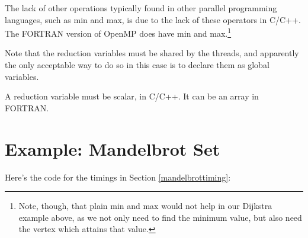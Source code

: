The lack of other operations typically found in other parallel
programming languages, such as min and max, is due to the lack of these
operators in C/C++.  The FORTRAN version of OpenMP does have min and
max.\footnote{Note, though, that plain min and max would not help in our
Dijkstra example above, as we not only need to find the minimum value,
but also need the vertex which attains that value.}

Note that the reduction variables must be shared by the threads, and
apparently the only acceptable way to do so in this case is to declare
them as global variables.

A reduction variable must be scalar, in C/C++.  It can be an array in
FORTRAN.

\section{Example: Mandelbrot Set}
\label{mandelbrotcode}

Here's the code for the timings in Section \ref{mandelbrottiming}:

